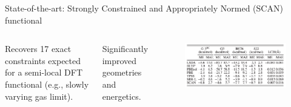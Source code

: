 \documentclass[aspectratio=169]{beamer}
\begin{document}
\begin{frame}{State-of-the-art: Strongly Constrained and Appropriately Normed (SCAN) functional}

\begin{columns}
Recovers 17 exact constraints expected for a semi-local DFT functional (e.g., slowly varying gas limit).\cite{sunStronglyConstrainedAppropriately2015}

Significantly improved geometries and energetics.\cite{sunAccurateFirstprinciplesStructures2016}
\begin{figure}
    \centering
    \includegraphics[width=0.8\linewidth]{lectures/figures/6_scan_performance.png}
\end{figure}
 

\end{columns}
\end{frame}
\end{document}

